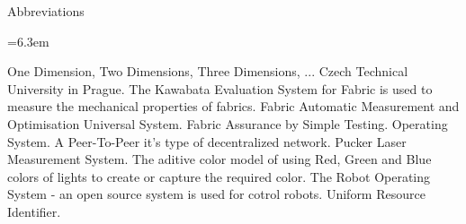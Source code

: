 \app Abbreviations

\medskip
\bgroup \leftskip=6.3em

\abbrv[1D,2D,3D,...] One Dimension, Two Dimensions, Three Dimensions, ...
\abbrv[CTU]  Czech Technical University in Prague.
\abbrv[KESF]  The Kawabata Evaluation System for Fabric is used to measure the mechanical properties of fabrics.
\abbrv[FAMOUS]  Fabric Automatic Measurement and Optimisation Universal System.
\abbrv[FAST]  Fabric Assurance by Simple Testing.
\abbrv[OS]	Operating System.
\abbrv[P2P]  A Peer-To-Peer it's type of decentralized network. 
\abbrv[PLMS]  Pucker Laser Measurement System.
\abbrv[RGB]  The aditive color model of using Red, Green and Blue colors of lights to create or capture the required color.
\abbrv[ROS]  The Robot Operating System - an open source system is used for cotrol robots.  
\abbrv[URI]  Uniform Resource Identifier.

\par\egroup
